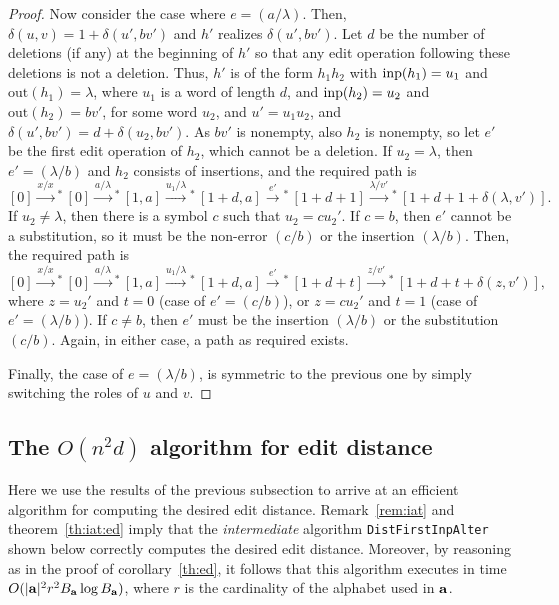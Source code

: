 \documentclass{article}
\theoremstyle{plain}
\theoremstyle{definition}
\theoremstyle{remark}
\newcommand{\xras}[1]{\xrightarrow{#1}\!\!{}^*\,}
\newcommand{\e}{\lambda}
\newcommand\dsid{\ensuremath{\delta}\xspace}
\newcommand\out{\mathrm{out}}
\newcommand\db{B}             \newcommand\dbold{D}   \newcommand\pssi{\par\smallskip\indent}
\begin{document}
\begin{proof}
Now consider the case where $e=(a/\e)$. Then, $\dsid(u,v)=1+\dsid(u',bv')$ and $h'$ realizes $\dsid(u',bv')$. Let $d$ be the number of deletions (if any) at the beginning of $h'$ so that any edit operation
following these deletions is not a deletion. Thus, $h'$ is of the form $h_1h_2$ with $\mathrm{inp}(h_1)=u_1$
and $\out(h_1)=\e$, where $u_1$ is a word of length $d$, and
$\mathrm{inp}(h_2)=u_2$ and $\out(h_2)=bv'$, for some word $u_2$, and
$u'=u_1u_2$,
and $\dsid(u',bv')=d+\dsid(u_2,bv')$.
As $bv'$ is nonempty, also $h_2$ is nonempty, so let $e'$ be the first edit operation of $h_2$, which
cannot be a deletion.
If $u_2=\e$, then $e'=(\e/b)$ and $h_2$ consists of insertions, and the required path is
\[
[0]\xras{x/x}[0]\xras{a/\e}[1,a]\xras{u_1\slash \e}[1+d,a]\xras{e'} [1+d+1]\xras{\e\slash v'} [1+d+1+\dsid(\e,v')].
\]
If $u_2\not=\e$, then there is a symbol $c$ such that $u_2=cu_2'$.
If $c=b$, then  $e'$ cannot be a substitution, so it must be the non-error $(c/b)$ or the insertion
$(\e/b)$. Then, the required path is
\[
[0]\xras{x/x}[0]\xras{a/\e}[1,a]\xras{u_1\slash \e}[1+d,a]\xras{e'}[1+d+t]
\xras{z\slash v'} [1+d+t+\dsid(z,v')],
\]
where $z=u_2'$ and $t=0$ (case of $e'=(c/b)$), or $z=cu_2'$ and $t=1$ (case of $e'=(\e/b)$).
If $c\not=b$, then $e'$ must be the insertion $(\e/b)$ or the substitution $(c/b)$. Again, in either case,
a path as required exists.

Finally, the case of $e=(\e/b)$, is symmetric to the previous one by simply switching the
roles of $u$ and $v$.
\end{proof}


\subsection{The $O(n^2d)$ algorithm for edit distance}
Here we use the results of the previous subsection to arrive at an efficient algorithm for computing the desired
edit distance.
Remark~\ref{rem:iat}  and theorem~\ref{th:iat:ed}  imply that the \emph{intermediate} algorithm
\texttt{DistFirstInpAlter}
shown below correctly computes the desired edit distance. Moreover, by reasoning as in the proof of corollary~\ref{th:ed}, it follows that this algorithm executes in time $O(\sz{\aut}^2r^2\db_{\aut}\log\db_{\aut})$, where $r$ is the cardinality of the alphabet used in $\mathbf{a}$.
\end{document}
